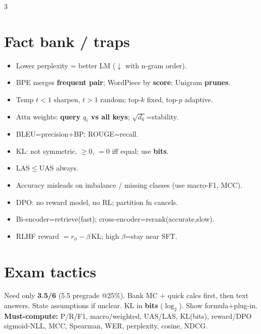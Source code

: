 \documentclass[12pt]{extarticle} %
\newcommand{\sub}[1]{\textcolor{key}{\textbf{#1}}}
\begin{document}
\begin{multicols}{3}
\section{Fact bank / traps}
\begin{itemize}
\item Lower perplexity = better LM ($\downarrow$ with n-gram order).
\item BPE merges \sub{frequent pair}; WordPiece by \sub{score}; Unigram \sub{prunes}.
\item Temp $t{<}1$ sharpen, $t{>}1$ random; top-$k$ fixed, top-$p$ adaptive.
\item Attn weights: \sub{query $q_i$ vs all keys}; $\sqrt{d_k}$=stability.
\item BLEU=precision+BP; ROUGE=recall.
\item KL: not symmetric, $\ge0$, $=0$ iff equal; use \sub{bits}.
\item LAS$\le$UAS always.
\item Accuracy misleads on imbalance / missing classes (use macro-F1, MCC).
\item DPO: no reward model, no RL; partition fn cancels.
\item Bi-encoder=retrieve(fast); cross-encoder=rerank(accurate,slow).
\item RLHF reward $=r_\phi-\beta\,$KL; high $\beta$=stay near SFT.
\end{itemize}

\section{Exam tactics}
Need only \sub{3.5/6} (5.5 pregrade @25\%). Bank MC + quick calcs first, then text answers. State assumptions if unclear. KL in \sub{bits} ($\log_2$). Show formula+plug-in. \sub{Must-compute:} P/R/F1, macro/weighted, UAS/LAS, KL(bits), reward/DPO sigmoid-NLL, MCC, Spearman, WER, perplexity, cosine, NDCG.

\end{multicols}
\end{document}
